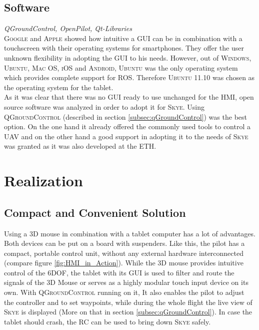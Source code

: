 \subsection{Software}
\textit{QGroundControl, OpenPilot, Qt-Libraries} \\
\textsc{Google} and \textsc{Apple} showed how intuitive a GUI can be in combination with a  touchscreen with their operating systems for smartphones. They offer the user unknown flexibility in adopting the GUI to his needs. However, out of \textsc{Windows}, \textsc{Ubuntu}, \textsc{Mac OS}, \textsc{iOS} and \textsc{Android}, \textsc{Ubuntu} was the only operating system which provides complete support for \textsc{ROS}. Therefore \textsc{Ubuntu 11.10} was chosen as the operating system for the tablet.\\
As it was clear that there was no GUI ready to use unchanged for the HMI, open source software was analyzed in order to adopt it for \textsc{Skye}. Using \textsc{QGroundControl} (described in section \ref{subsec:qGroundControl}) was the best option. On the one hand it already offered the commonly used tools to control a UAV and on the other hand a good support in adopting it to the needs of \textsc{Skye} was granted as it was also developed at the \textsc{ETH}.




\section{Realization}
\label{sec:realization}



\subsection{Compact and Convenient Solution}
Using a 3D mouse in combination with a tablet computer has a lot of advantages. Both devices can be put on a board with suspenders. Like this, the pilot has a compact, portable control unit, without any external hardware interconnected (compare figure \ref{fig:HMI_in_Action}). While the 3D mouse provides intuitive control of the 6DOF, the tablet with its GUI is used to filter and route the signals of the 3D Mouse or serves as a highly modular touch input device on its own. With \textsc{QGroundControl} running on it, It also enables the pilot to adjust the controller and to set waypoints, while during the whole flight the live view of \textsc{Skye} is displayed (More on that in section \ref{subsec:qGroundControl}). In case the tablet should crash, the RC can be used to bring down \textsc{Skye} safely.

